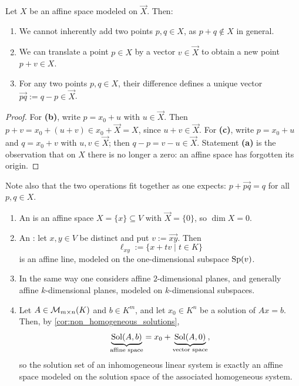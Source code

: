 \begin{proposition}
  \label{prop:affine_algebra}
  Let $X$ be an affine space modeled on $\vec{X}$. Then:
  \begin{enumerate}[label=\textbf{(\alph*)}]
    \item We cannot inherently add two points $p, q \in X$, as $p+q \notin X$ in general.
    \item We can translate a point $p \in X$ by a vector $v \in \vec{X}$ to obtain a new point $p+v \in X$.
    \item For any two points $p, q \in X$, their difference defines a unique vector $\vec{pq} := q - p \in \vec{X}$.
  \end{enumerate}
\end{proposition}

\begin{proof}
For \textbf{(b)}, write $p = x_0 + u$ with $u \in \vec{X}$. Then $p + v = x_0 + (u + v) \in x_0 + \vec{X} = X$, since $u + v \in \vec{X}$. For \textbf{(c)}, write $p = x_0 + u$ and $q = x_0 + v$ with $u, v \in \vec{X}$; then $q - p = v - u \in \vec{X}$. Statement \textbf{(a)} is the observation that on $X$ there is no longer a zero: an affine space has forgotten its origin.
\end{proof}

Note also that the two operations fit together as one expects: $p + \vec{pq} = q$ for all $p, q \in X$.

\begin{example}
\label{ex:affine_spaces}
\begin{enumerate}[label=\textbf{(\alph*)}]
    \item An  is an affine space $X = \{x\} \subseteq V$ with $\vec{X} = \{0\}$, so $\dim X = 0$.
    \item An : let $x, y \in V$ be distinct and put $v := \vec{xy}$. Then
    \[
    \ell_{xy} := \{x + t v \mid t \in K\}
    \]
    is an affine line, modeled on the one-dimensional subspace $\operatorname{Sp}(v)$.
    \item In the same way one considers affine $2$-dimensional planes, and generally affine $k$-dimensional planes, modeled on $k$-dimensional subspaces.
    \item Let $A \in \mathcal{M}_{m \times n}(K)$ and $b \in K^m$, and let $x_0 \in K^n$ be a solution of $Ax = b$. Then, by \cref{cor:non_homogeneous_solutions},
    \[
    \underbrace{\operatorname{Sol}(A, b)}_{\text{affine space}} = x_0 + \underbrace{\operatorname{Sol}(A, 0)}_{\text{vector space}},
    \]
    so the solution set of an inhomogeneous linear system is exactly an affine space modeled on the solution space of the associated homogeneous system.
\end{enumerate}
\end{example}

